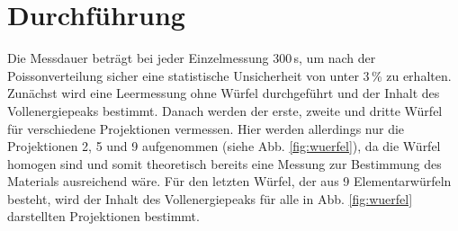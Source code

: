 \section{Durchführung}
\label{sec:Durchführung}

        Die Messdauer beträgt bei jeder Einzelmessung 300\,s, um nach der Poissonverteilung 
        sicher eine statistische Unsicherheit von unter 3\,\% zu erhalten. 
        Zunächst wird eine Leermessung ohne Würfel durchgeführt und der Inhalt des 
        Vollenergiepeaks bestimmt. Danach werden der erste, zweite und dritte Würfel 
        für verschiedene Projektionen vermessen. Hier werden allerdings nur die Projektionen 
        2, 5 und 9 aufgenommen (siehe Abb. \ref{fig:wuerfel}), da die Würfel homogen sind 
        und somit theoretisch bereits eine Messung zur Bestimmung des Materials ausreichend wäre.
        Für den letzten Würfel, der aus 9 Elementarwürfeln besteht, wird der Inhalt des 
        Vollenergiepeaks für alle in Abb. \ref{fig:wuerfel} darstellten Projektionen bestimmt.